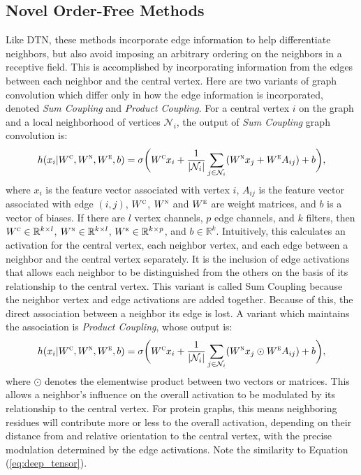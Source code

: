 \subsection{Novel Order-Free Methods}
Like DTN, these methods incorporate edge information to help differentiate neighbors, but also avoid imposing an arbitrary ordering on the neighbors in a receptive field.
This is accomplished by incorporating information from the edges between each neighbor and the central vertex.
Here are two variants of graph convolution which differ only in how the edge information is incorporated, denoted \textit{Sum Coupling} and \textit{Product Coupling}.
For a central vertex $i$ on the graph and a local neighborhood of vertices $\mathcal{N}_i$, the output of \emph{Sum Coupling} graph convolution is:
\begin{equation}
h(x_i | W^\textsc{c}, W^\textsc{n}, W^\textsc{e}, b) = \sigma \bigg( W^{\textsc{c}} x_i + \frac{1}{|\mathcal{N}_i|}\sum_{j \in \mathcal{N}_i} (W^{\textsc{n}} x_j + W^{\textsc{e}} A_{ij}) + b \bigg),
\label{eq:sum_coupling}
\end{equation}
where $x_i$ is the feature vector associated with vertex $i$, $A_{ij}$ is the feature vector associated with edge $(i, j)$, $W^\textsc{c}$, $W^\textsc{n}$ and $W^\textsc{e}$ are weight matrices, and $b$ is a vector of biases. 
If there are $l$ vertex channels, $p$ edge channels, and $k$ filters, then $W^\textsc{c}\in\mathbb{R}^{k \times l}$, $W^\textsc{n}\in\mathbb{R}^{k \times l}$, $W^\textsc{e}\in\mathbb{R}^{k \times p}$, and $b\in\mathbb{R}^{k}$.
Intuitively, this calculates an activation for the central vertex, each neighbor vertex, and each edge between a neighbor and the central vertex separately.
It is the inclusion of edge activations that allows each neighbor to be distinguished from the others on the basis of its relationship to the central vertex.
This variant is called Sum Coupling because the neighbor vertex and edge activations are added together.
Because of this, the direct association between a neighbor its edge is lost.
A variant which maintains the association is \emph{Product Coupling}, whose output is:
\begin{equation}
h(x_i | W^\textsc{c}, W^\textsc{n}, W^\textsc{e}, b) = \sigma \bigg( W^{\textsc{c}} x_i + \frac{1}{|\mathcal{N}_i|}\sum_{j \in \mathcal{N}_i} (W^{\textsc{n}} x_j \odot W^{\textsc{e}} A_{ij}) + b \bigg),
\label{eq:prod_coupling}
\end{equation}
where $\odot$ denotes the elementwise product between two vectors or matrices. 
This allows a neighbor's influence on the overall activation to be modulated by its relationship to the central vertex.
For protein graphs, this means neighboring residues will contribute more or less to the overall activation, depending on their distance from and relative orientation to the central vertex, with the precise modulation determined by the edge activations.
Note the similarity to Equation (\ref{eq:deep_tensor}).

